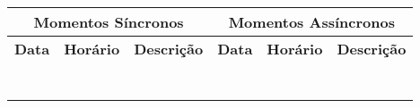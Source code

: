 \documentclass[12pt, a4paper, oneside]{book}
\begin{document}
\begin{table}[]
	\begin{tabular}{|l|l|l|l|l|l|}
		\hline
		\multicolumn{3}{|c|}{\textbf{Momentos Síncronos}}                                                                                        & \multicolumn{3}{c|}{\textbf{Momentos   Assíncronos}}                                                                                   \\ \hline
		\multicolumn{1}{|c|}{\textbf{Data}}        & \multicolumn{1}{c|}{\textbf{Horário}}       & \multicolumn{1}{c|}{\textbf{Descrição}}       & \multicolumn{1}{c|}{\textbf{Data}}       & \multicolumn{1}{c|}{\textbf{Horário}}       & \multicolumn{1}{c|}{\textbf{Descrição}}       \\ \hline
		&                                             &                                               &                                          &                                             &                                               \\ \hline
		&                                             &                                               &                                          &                                             &                                               \\ \hline
		&                                             &                                               &                                          &                                             &                                               \\ \hline
		&                                             &                                               &                                          &                                             &                                               \\ \hline
		&                                             &                                               &                                          &                                             &                                               \\ \hline
		&                                             &                                               &                                          &                                             &                                               \\ \hline
		&                                             &                                               &                                          &                                             &                                               \\ \hline

\end{tabular}
\end{table}
\end{document}
